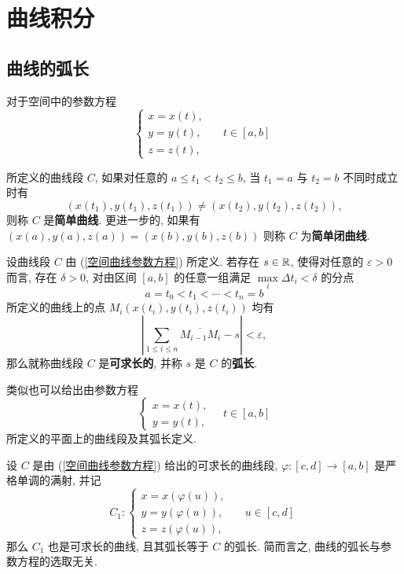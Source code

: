 \newpage
\chapter{曲线积分}

\section{曲线的弧长}

\begin{definition}\label{简单曲线}
	对于空间中的参数方程
	\begin{equation}\label{空间曲线参数方程}
		\left\{
		\begin{array}{lr}
			x=x(t), & \\
			y=y(t), &\quad t\in[a,b] \\
			z=z(t), &
		\end{array}
		\right.
	\end{equation}

	所定义的曲线段 $C$, 如果对任意的 $a\leqslant t_1<t_2\leqslant b$, 当 $t_1=a$ 与 $t_2=b$ 不同时成立时有 $$(x(t_1),y(t_1),z(t_1))\neq(x(t_2),y(t_2),z(t_2)),$$ 则称 $C$ 是\textbf{简单曲线}. 更进一步的, 如果有 $(x(a),y(a),z(a))=(x(b),y(b),z(b))$ 则称 $C$ 为\textbf{简单闭曲线}.
\end{definition}

\begin{definition}\label{弧长定义}
	 设曲线段 $C$ 由 (\ref{空间曲线参数方程}) 所定义. 若存在 $s\in\mathbb R$, 使得对任意的 $\varepsilon>0$ 而言, 存在 $\delta>0$, 对由区间 $[a,b]$ 的任意一组满足 $\max\limits_{i}\Delta t_i<\delta$ 的分点 $$a=t_0<t_1<\cdots<t_n=b$$ 所定义的曲线上的点 $M_i(x(t_i),y(t_i),z(t_i))$ 均有 $$\left|\sum\limits_{1\leqslant i\leqslant n}\overline{M_{i-1}M_i}-s\right|<\varepsilon,$$
	 那么就称曲线段 $C$ 是\textbf{可求长的}, 并称 $s$ 是 $C$ 的\textbf{弧长}.
\end{definition}

类似也可以给出由参数方程
\begin{equation}\label{平面曲线参数方程}
	\left\{
	\begin{array}{c}
		x=x(t),  \\
		y=y(t),
	\end{array}
	\right. \quad t\in[a,b]
\end{equation}
所定义的平面上的曲线段及其弧长定义.

\begin{proposition}
	设 $C$ 是由 (\ref{空间曲线参数方程}) 给出的可求长的曲线段, $\varphi:[c,d]\longrightarrow[a,b]$ 是严格单调的满射, 并记 $$C_1:\left\{
	\begin{array}{lr}
		x=x(\varphi(u)), & \\
		y=y(\varphi(u)), &\quad u\in[c,d] \\
		z=z(\varphi(u)), &
	\end{array}
	\right.$$
	那么 $C_1$ 也是可求长的曲线, 且其弧长等于 $C$ 的弧长. 简而言之, 曲线的弧长与参数方程的选取无关.
\end{proposition}

